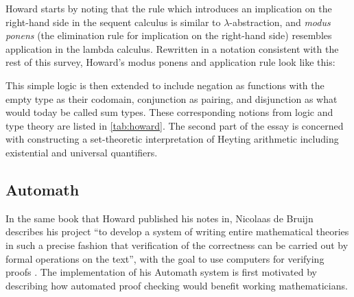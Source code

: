 \documentclass[12pt,toc=bibliography,numbers=noendperiod,
               footnotes=multiple,twoside]{scrartcl}
\begin{document}
Howard starts by noting that the rule which introduces an implication on the right-hand side in the sequent calculus is similar to \(\lambda\)-abstraction, and \emph{modus ponens} (the elimination rule for implication on the right-hand side) resembles application in the lambda calculus. Rewritten in a notation consistent with the rest of this survey, Howard's modus ponens and application rule look like this:

\begin{figure}[h]
\begin{minipage}[b]{1\linewidth}
\centering
\begin{minipage}[b]{0.4\linewidth}
\begin{prooftree}
\end{prooftree}
\end{minipage}
\begin{minipage}[b]{0.4\linewidth}
\begin{prooftree}
\end{prooftree}
\end{minipage}
\end{minipage}
\end{figure}


This simple logic is then extended to include negation as functions with the empty type as their codomain, conjunction as pairing, and disjunction as what would today be called sum types. These corresponding notions from logic and type theory are listed in \cref{tab:howard}. The second part of the essay is concerned with constructing a set-theoretic interpretation of Heyting arithmetic including existential and universal quantifiers.

\subsection{Automath}

In the same book that Howard published his notes in, Nicolaas de Bruijn describes his project \enquote{to develop a system of writing entire mathematical theories in such a precise fashion that verification of the correctness can be carried out by formal operations on the text}, with the goal to use computers for verifying proofs \autocite{de_bruijn_survey_1980}. The implementation of his Automath system is first motivated by describing how automated proof checking would benefit working mathematicians.
\end{document}
